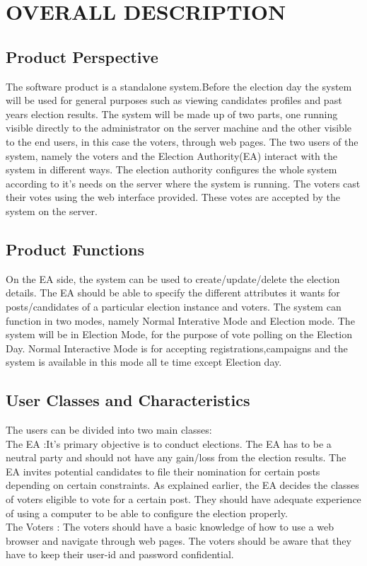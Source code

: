 \documentclass[12pt,a4paper,oneside]{report}
\begin{document}
\chapter{OVERALL DESCRIPTION}
\section{Product Perspective}
The software product is a standalone system.Before the election day the system will be used for general purposes such as viewing candidates profiles and past years election results. The system will be made up of two parts, one running visible directly to the administrator on the server machine and the other visible to the end users, in this case the voters, through web pages. The two users of the system, namely the voters and the Election Authority(EA) interact with the system in diﬀerent ways. The election authority conﬁgures the whole system according to it’s needs on the server where the system is running. The voters cast their votes using the web interface provided. These votes are accepted by the system on the server.
\section{Product Functions}
\par
On the EA side, the system can be used to create/update/delete the election details. The EA should be able to specify the diﬀerent attributes it wants for posts/candidates of a particular election instance and voters. The system can function in two modes, namely Normal Interative Mode and Election mode. The system will be in Election Mode, for the purpose of vote polling on the Election Day. Normal Interactive Mode is for accepting registrations,campaigns and the system is available in this mode all te time except Election day.
\section{User Classes and Characteristics}
The users can be divided into two main classes: \\
 The EA :It’s primary objective is to conduct elections. The EA has to be a neutral party and should not have any gain/loss from the election results. The EA invites potential candidates to ﬁle their nomination for certain posts depending on certain constraints. As explained earlier, the EA decides the classes of voters eligible to vote for a certain post. They should have adequate experience of using a computer to be able to conﬁgure the election properly.\\ 
 The Voters : The voters should have a basic knowledge of how to use a web browser and navigate through web pages. The voters should be aware that they have to keep their user-id and password conﬁdential.
\end{document}
